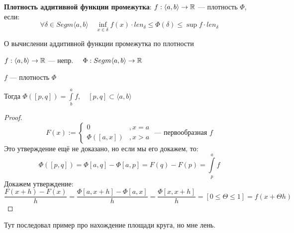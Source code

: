 \begin{definition}
    \textbf{Плотность аддитивной функции промежутка}: $f:\langle a,b\rangle \to\mathbb{R}$ --- плотность $\Phi$, если:
    $$\forall \delta\in Segm\langle a,b\rangle \quad \inf\limits_{x\in\delta} f(x)\cdot len_\delta\leq \Phi(\delta)\leq\sup f \cdot len_\delta$$
\end{definition}

\begin{theorem}
    О вычислении аддитивной функции промежутка по плотности

    $f:\langle a,b\rangle \to \mathbb{R}$ --- непр. $\quad \Phi : Segm\langle a,b\rangle\to\mathbb{R}$

    $f$ --- плотность $\Phi$

    Тогда $\Phi([p,q])=\int\limits_b^a f, \quad [p,q]\subset \langle a,b\rangle$
\end{theorem}
\begin{proof}
    $$F(x):=\begin{cases}
        0 &, x=a \\
        \Phi([a,x]) &, x>a
    \end{cases} \text{ --- первообразная } f$$
    Это утверждение ещё не доказано, но если мы его докажем, то:
    $$\Phi([p,q])=\Phi[a,q]-\Phi[a,p]=F(q)-F(p)=\int\limits_p^af$$
    Докажем утверждение:
    $$\frac{F(x+h)-F(x)}{h}=\frac{\Phi[a,x+h]-\Phi[a,x]}{h}=\frac{\Phi[x,x+h]}{h}=[0\leq\Theta\leq1]=f(x+\Theta h)$$
\end{proof}

Тут последовал пример про нахождение площади круга, но мне лень.

